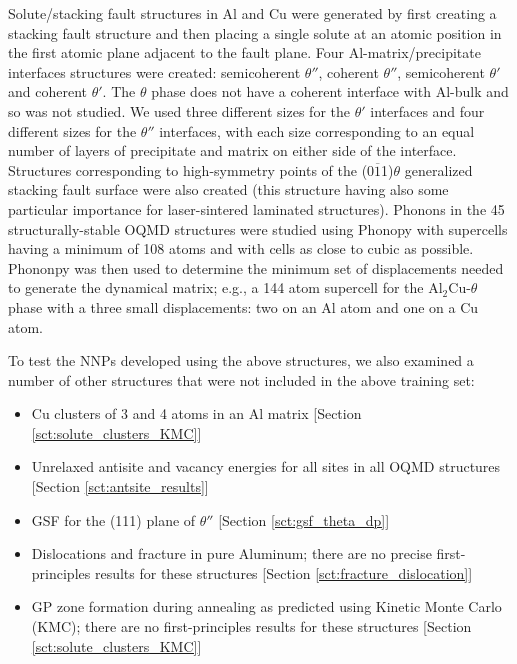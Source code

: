 \documentclass{article}
\begin{document}
Solute/stacking fault structures in Al and Cu were generated by first creating a stacking fault structure and then placing a single solute at an atomic position in the first atomic plane adjacent to the fault plane.
Four Al-matrix/precipitate interfaces structures were created: semicoherent $\theta''$, coherent $\theta''$,
semicoherent $\theta'$ and coherent $\theta'$. The $\theta$ phase does not have a coherent interface\cite{Nie2014PhysicalAlloys} with Al-bulk and so was not studied.
We used three different sizes for the $\theta'$ interfaces and four different sizes for the $\theta''$ interfaces, with each size corresponding to an equal number of layers of precipitate and matrix on either side of the interface. 
Structures corresponding to high-symmetry points of the (0$\overline{1}$1)$\theta$ generalized stacking fault surface were also created (this structure having also some particular importance for laser-sintered laminated structures\cite{Wang2018}).
Phonons in the 45 structurally-stable OQMD structures were studied using Phonopy\cite{Togo2015FirstScience} with supercells having a minimum of 108 atoms and with cells as close to cubic as possible.
Phononpy was then used to determine the minimum set of displacements needed to generate the dynamical matrix; e.g., a 144 atom supercell for the Al$_2$Cu-$\theta$ phase with a three small displacements: two on an Al atom and one on a Cu atom.


To test the NNPs developed using the above structures, we also examined a number of other structures that were not included in the above training set:
\begin{itemize}
  
    \item Cu clusters of 3 and 4 atoms in an Al matrix [Section \ref{sct:solute_clusters_KMC}] 
    \item Unrelaxed antisite and vacancy energies for all sites in all OQMD structures [Section \ref{sct:antsite_results}]
    \item GSF for the (111) plane of $\theta''$  [Section \ref{sct:gsf_theta_dp}]
    \item Dislocations and fracture in pure Aluminum; there are no precise first-principles results for these structures [Section \ref{sct:fracture_dislocation}]
    \item GP zone formation during annealing as predicted using Kinetic Monte Carlo (KMC); there are no first-principles results for these structures  [Section \ref{sct:solute_clusters_KMC}] 
\end{itemize}
\end{document}
